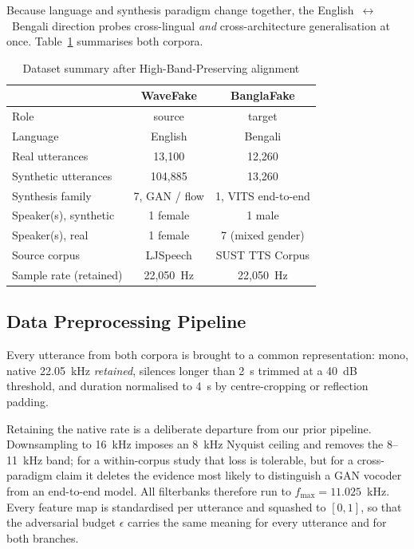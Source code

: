 \documentclass[conference]{IEEEtran}
\begin{document}
Because language and synthesis paradigm change together, the
English~$\leftrightarrow$~Bengali direction probes cross-lingual \emph{and}
cross-architecture generalisation at once. Table~\ref{tab:datasets} summarises
both corpora.

\begin{table}[!t]
\caption{Dataset summary after High-Band-Preserving alignment}
\label{tab:datasets}
\centering
\begin{tabular}{lcc}
\toprule
& \textbf{WaveFake} & \textbf{BanglaFake} \\
\midrule
Role                    & source        & target \\
Language                & English       & Bengali \\
Real utterances         & 13,100        & 12,260 \\
Synthetic utterances    & 104,885       & 13,260 \\
Synthesis family        & 7, GAN / flow & 1, VITS end-to-end \\
Speaker(s), synthetic   & 1 female      & 1 male \\
Speaker(s), real        & 1 female      & 7 (mixed gender) \\
Source corpus           & LJSpeech      & SUST TTS Corpus \\
Sample rate (retained)  & 22,050~Hz     & 22,050~Hz \\
\bottomrule
\end{tabular}
\end{table}

\subsection{Data Preprocessing Pipeline}
\label{sec:hbp}
Every utterance from both corpora is brought to a common representation: mono,
native 22.05~kHz \emph{retained}, silences longer than 2~s trimmed at a 40~dB
threshold, and duration normalised to 4~s by centre-cropping or reflection
padding.

Retaining the native rate is a deliberate departure from our prior pipeline.
Downsampling to 16~kHz imposes an 8~kHz Nyquist ceiling and removes the
8--11~kHz band; for a within-corpus study that loss is tolerable, but for a
cross-paradigm claim it deletes the evidence most likely to distinguish a GAN
vocoder from an end-to-end model. All filterbanks therefore run to
$f_{\max} = 11.025$~kHz. Every feature map is standardised per utterance and
squashed to $[0,1]$, so that the adversarial budget $\epsilon$ carries the
same meaning for every utterance and for both branches.
\end{document}
